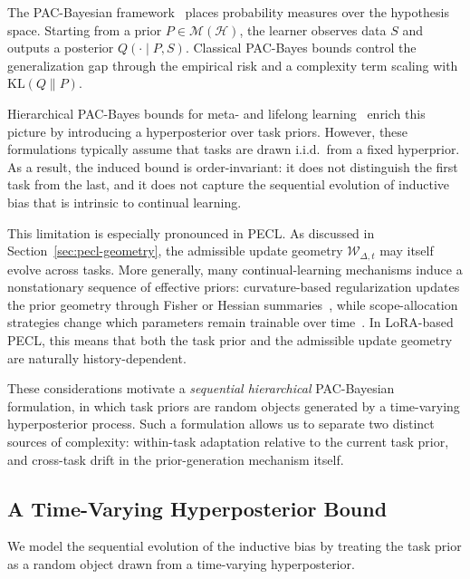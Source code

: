 \documentclass[10pt]{article} %
\begin{document}
The PAC-Bayesian framework~\citep{mcallesterPACBayesianModelAveraging1999,mcallesterPACBayesianStochasticModel2003} places probability measures over the hypothesis space.
Starting from a prior $P \in \mathcal{M}(\mathcal{H})$, the learner observes data $S$ and outputs a posterior $Q(\cdot \mid P,S)$.
Classical PAC-Bayes bounds control the generalization gap through the empirical risk and a complexity term scaling with $\mathrm{KL}(Q\|P)$.

Hierarchical PAC-Bayes bounds for meta- and lifelong learning~\citep{pentinaPACBayesianBoundLifelong2014,JMLR:v24:22-1254} enrich this picture by introducing a hyperposterior over task priors.
However, these formulations typically assume that tasks are drawn i.i.d.\ from a fixed hyperprior.
As a result, the induced bound is order-invariant: it does not distinguish the first task from the last, and it does not capture the sequential evolution of inductive bias that is intrinsic to continual learning.

This limitation is especially pronounced in PECL.
As discussed in Section~\ref{sec:pecl-geometry}, the admissible update geometry $\mathcal{W}_{\Delta,t}$ may itself evolve across tasks.
More generally, many continual-learning mechanisms induce a nonstationary sequence of effective priors:
curvature-based regularization updates the prior geometry through Fisher or Hessian summaries~\citep{EWC2017,SI2017}, while scope-allocation strategies change which parameters remain trainable over time~\citep{HAT2018,Supermasks2020,pmlr-v97-houlsby19a}.
In LoRA-based PECL, this means that both the task prior and the admissible update geometry are naturally history-dependent.

These considerations motivate a \emph{sequential hierarchical} PAC-Bayesian formulation, in which task priors are random objects generated by a time-varying hyperposterior process.
Such a formulation allows us to separate two distinct sources of complexity:
within-task adaptation relative to the current task prior, and cross-task drift in the prior-generation mechanism itself.

\subsection{A Time-Varying Hyperposterior Bound}
\label{sec:time-varying-bound}

We model the sequential evolution of the inductive bias by treating the task prior as a random object drawn from a time-varying hyperposterior.
\end{document}

